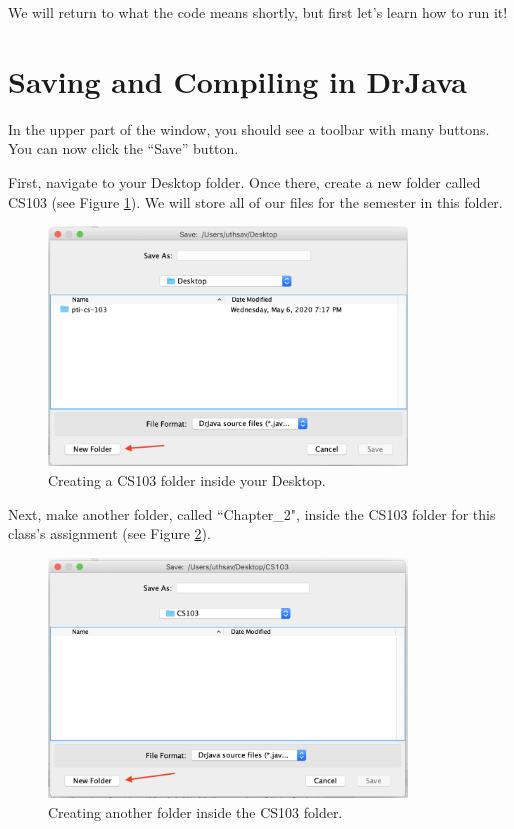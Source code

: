 We will return to what the code means shortly, but first let's learn how to run it!

\section{Saving and Compiling in DrJava}

In the upper part of the window, you should see a toolbar with many buttons.
You can now click the ``Save'' button. 

First, navigate to your Desktop folder. Once there, create a new folder called CS103 (see Figure \ref{fig:helloworld:sec:saving}). We will store all of our files for the semester in this folder. 

\begin{figure}[ht]
	\centering
	\includegraphics[width=0.85\textwidth]{images/hello_world_saving}
	\caption{Creating a CS103 folder inside your Desktop.}
	\label{fig:helloworld:sec:saving}
\end{figure}

Next, make another folder, called ``Chapter\_2", inside the CS103 folder for this class's assignment (see Figure \ref{fig:helloworld:sec:saving2}).

\begin{figure}[ht]
	\centering
	\includegraphics[width=0.85\textwidth]{images/hello_world_saving2}
	\caption{Creating another folder inside the CS103 folder.}
	\label{fig:helloworld:sec:saving2}
\end{figure}

